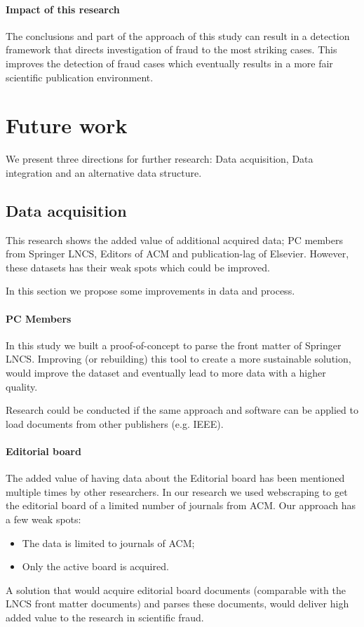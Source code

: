 \documentclass{ou-report}
\begin{document}
\paragraph{Impact of this research}
The conclusions and part of the approach of this study can result in a detection
framework that directs investigation of fraud to the most striking cases. This
improves the detection of fraud cases which eventually results in a more fair
scientific publication environment.

\section{Future work}
We present three directions for further research: Data acquisition, Data 
integration and an alternative data structure.

\subsection{Data acquisition}
This research shows the added value of additional acquired data; PC members from 
Springer LNCS, Editors of ACM and publication-lag of Elsevier. However, these 
datasets has their weak spots which could be improved. 

In this section we propose some improvements in data and process.

\paragraph{PC Members}
In this study we built a proof-of-concept to parse the front matter of Springer 
LNCS. Improving (or rebuilding) this tool to create a more sustainable solution, 
would improve the dataset and eventually lead to more data with a higher quality. 

Research could be conducted if the same approach and software can be applied to
load documents from other publishers (e.g. IEEE).

\paragraph{Editorial board}
The added value of having data about the Editorial board has been mentioned 
multiple times by other researchers. In our research we used webscraping to get
the editorial board of a limited number of journals from ACM. Our approach has a 
few weak spots:
\begin{itemize}
    \item The data is limited to journals of ACM;
    \item Only the active board is acquired.
\end{itemize}
A solution that would acquire editorial board documents (comparable with the 
LNCS front matter documents) and parses these documents, would deliver high 
added value to the research in scientific fraud.
\end{document}
